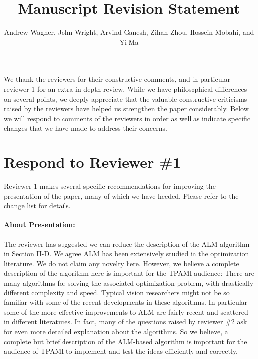 \documentclass[11pt]{article}
\begin{document}
   

   \title{\Large {\bf Manuscript  Revision Statement}}

       \author{{Andrew Wagner, John Wright, Arvind Ganesh, Zihan Zhou, Hossein Mobahi, and Yi Ma}}

   \date{}
   \maketitle

We thank the reviewers for their constructive comments, and in particular
reviewer 1 for an extra in-depth review.  While we have philosophical
differences on several points, we deeply appreciate that the valuable constructive 
criticisms raised by the reviewers have helped us strengthen the paper considerably.  
Below we will respond to comments of the reviewers in order as well as indicate 
specific changes that we have made to address their concerns.


\section{Respond to Reviewer \#1}
Reviewer 1 makes several specific recommendations for improving the
presentation of the paper, many of which we have heeded.  Please refer to the change
list for details. 

\paragraph{About Presentation:} The reviewer has suggested we can reduce the description
of the ALM algorithm in Section II-D. We agree ALM has been extensively studied in the optimization 
literature. We do not claim any novelty here. However, we believe a complete description of the algorithm 
here is important for the TPAMI audience: There are
many algorithms for solving the associated optimization problem, with drastically different complexity
and speed. Typical vision researchers might not be so familiar with some of the recent
developments in these algorithms. In particular some of the more effective improvements to ALM are fairly 
recent and scattered in different literatures. In fact, many of the questions raised by reviewer \#2
ask for even more detailed explanation about the algorithms. So we believe, a complete but brief 
description of the ALM-based algorithm is important for the audience of TPAMI to implement and 
test the ideas efficiently and correctly.
\end{document}
